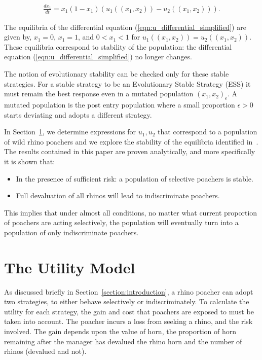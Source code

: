 \documentclass[10pt]{article}
\begin{document}
\begin{eqnarray}
    \label{eqn:u_differential_simplified}
    \frac{dx_1}{dt}= x_1(1 - x_1)(u_1((x_1, x_2)) - u_2((x_1, x_2))).
\end{eqnarray}

The equilibria of the differential equation (\ref{eqn:u_differential_simplified})
are given by, \(x_1=0\), \(x_1=1\), and \(0<x_1<1\) for \(u_1((x_1, x_2))=u_2((x_1, x_2))\).
These equilibria correspond to stability of the population: the differential
equation (\ref{eqn:u_differential_simplified}) no longer changes.

The notion of evolutionary stability can be checked only for these stable strategies.
For a stable strategy to be an Evolutionary Stable Strategy (ESS) it must remain
the best response even in a mutated population \((x_1, x_2)_\epsilon\). A mutated population
is the post entry population
where a small proportion \(\epsilon > 0\) starts deviating and adopts a different strategy.

In Section~\ref{section:the_model}, we determine expressions
for \(u_1, u_2\) that correspond to a population of wild rhino poachers and we
explore the stability of the equilibria identified in~\cite{Lee}. The results
contained in this paper are proven analytically, and more specifically it is
shown that:

\begin{itemize}
    \item In the presence of sufficient risk: a population of selective poachers
        is stable.
    \item Full devaluation of all rhinos will lead to indiscriminate poachers.
\end{itemize}

This implies that under almost all conditions, no matter what current proportion
of poachers are acting selectively, the population will eventually turn into a
population of only indiscriminate poachers.

\section{The Utility Model}\label{section:the_model}

As discussed briefly in Section~\ref{section:introduction}, a rhino poacher
can adopt two strategies, to either behave selectively
or indiscriminately. To calculate the utility for each strategy, the gain and cost
that poachers are exposed to must be taken into account. The poacher incurs a
loss from seeking a rhino, and the risk involved. The gain depends upon the value
of horn, the proportion of horn remaining after the manager has devalued the
rhino horn and the number of rhinos (devalued and not).
\end{document}
